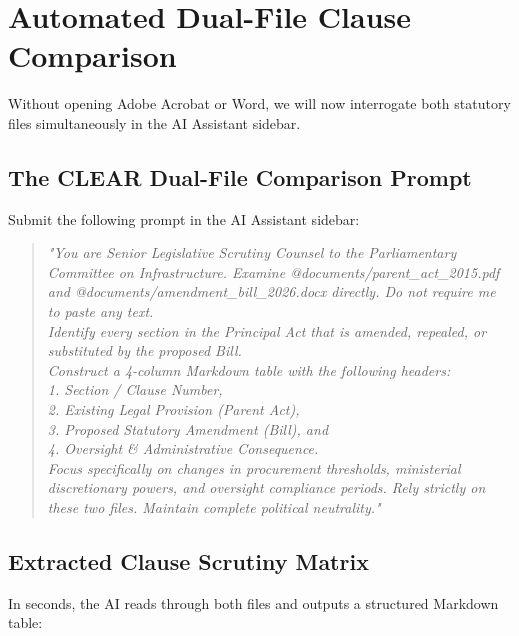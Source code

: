 \documentclass[11pt, a4paper]{report}
\begin{document}
\section{Automated Dual-File Clause Comparison}
Without opening Adobe Acrobat or Word, we will now interrogate both statutory files simultaneously in the AI Assistant sidebar.

\subsection{The CLEAR Dual-File Comparison Prompt}
Submit the following prompt in the AI Assistant sidebar:
\begin{quote}
\small
\textit{"You are Senior Legislative Scrutiny Counsel to the Parliamentary Committee on Infrastructure. Examine @documents/parent\_act\_2015.pdf and @documents/amendment\_bill\_2026.docx directly. Do not require me to paste any text. \\
Identify every section in the Principal Act that is amended, repealed, or substituted by the proposed Bill. \\
Construct a 4-column Markdown table with the following headers: \\
1. Section / Clause Number, \\
2. Existing Legal Provision (Parent Act), \\
3. Proposed Statutory Amendment (Bill), and \\
4. Oversight \& Administrative Consequence. \\
Focus specifically on changes in procurement thresholds, ministerial discretionary powers, and oversight compliance periods. Rely strictly on these two files. Maintain complete political neutrality."}
\end{quote}

\subsection{Extracted Clause Scrutiny Matrix}
In seconds, the AI reads through both files and outputs a structured Markdown table:
\end{document}
